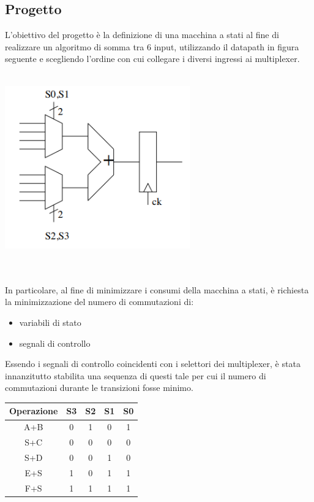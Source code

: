 \documentclass[11pt,  english, makeidx, a4paper, titlepage, oneside]{book}
\begin{document}
\subsection{Progetto}
L'obiettivo del progetto è la definizione di una macchina  a stati al fine di realizzare un algoritmo di somma tra 6 input, utilizzando il datapath in figura seguente e scegliendo l'ordine con cui collegare i diversi ingressi ai multiplexer.
\\\\
\centerline{\includegraphics[width=8cm]{./img/Lab_2/Datapath.png}}
\\\\   
In particolare, al fine di minimizzare i consumi della macchina a stati, è richiesta la minimizzazione del numero di commutazioni di:
\begin{itemize}
\item variabili di stato
\item segnali di controllo
\end{itemize} 
Essendo i segnali di controllo coincidenti con i selettori dei multiplexer, è stata innanzitutto stabilita una sequenza di questi tale per cui il numero di commutazioni durante le transizioni fosse minimo.
\begin{center}
	\begin{tabular}{|c|c|c|c|c|}
	\hline
	Operazione & S3 & S2 & S1 & S0 \\ 
	\hline
	A+B & 0 & 1 & 0 & 1 \\
	\hline
	S+C & 0 & 0 & 0 & 0  \\
	\hline
	S+D & 0 & 0 & 1 & 0  \\
	\hline
    E+S & 1 & 0 & 1 & 1  \\
	\hline
	F+S & 1 & 1 & 1 & 1 \\
	\hline
	\end{tabular}	
\end{center}
\end{document}
